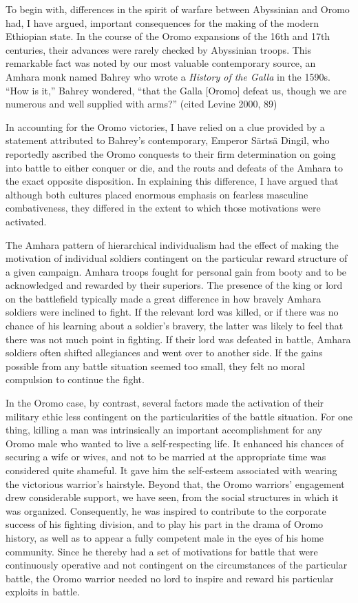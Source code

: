 To begin with, differences in the spirit of warfare between Abyssinian and Oromo had, I have argued, important consequences for the making of the modern Ethiopian state. In the course of the Oromo expansions of the 16th and 17th centuries, their advances were rarely checked by Abyssinian troops. This remarkable fact was noted by our most valuable contemporary source, an Amhara monk named Bahrey who wrote a \emph{History of the Galla} in the 1590s. ``How is it,'' Bahrey wondered, ``that the Galla [Oromo] defeat us, though we are numerous and well supplied with arms?'' (cited Levine 2000, 89) 

In accounting for the Oromo victories, I have relied on a clue provided by a statement attributed to Bahrey's contemporary, Emperor S\"{a}rts\"{a} Dingil, who reportedly ascribed the Oromo conquests to their firm determination on going into battle to either conquer or die, and the routs and defeats of the Amhara to the exact opposite disposition. In explaining this difference, I have argued that although both cultures placed enormous emphasis on fearless masculine combativeness, they differed in the extent to which those motivations were activated. 

The Amhara pattern of hierarchical individualism had the effect of making the motivation of individual soldiers contingent on the particular reward structure of a given campaign. Amhara troops fought for personal gain from booty and to be acknowledged and rewarded by their superiors. The presence of the king or lord on the battlefield typically made a great difference in how bravely Amhara soldiers were inclined to fight. If the relevant lord was killed, or if there was no chance of his learning about a soldier's bravery, the latter was likely to feel that there was not much point in fighting. If their lord was defeated in battle, Amhara soldiers often shifted allegiances and went over to another side. If the gains possible from any battle situation seemed too small, they felt no moral compulsion to continue the fight. 

In the Oromo case, by contrast, several factors made the activation of their military ethic less contingent on the particularities of the battle situation. For one thing, killing a man was intrinsically an important accomplishment for any Oromo male who wanted to live a self-respecting life. It enhanced his chances of securing a wife or wives, and not to be married at the appropriate time was considered quite shameful. It gave him the self-esteem associated with wearing the victorious warrior's hairstyle. Beyond that, the Oromo warriors' engagement drew considerable support, we have seen, from the social structures in which it was organized. Consequently, he was inspired to contribute to the corporate success of his fighting division, and to play his part in the drama of Oromo history, as well as to appear a fully competent male in the eyes of his home community. Since he thereby had a set of motivations for battle that were continuously operative and not contingent on the circumstances of the particular battle, the Oromo warrior needed no lord to inspire and reward his particular exploits in battle.

